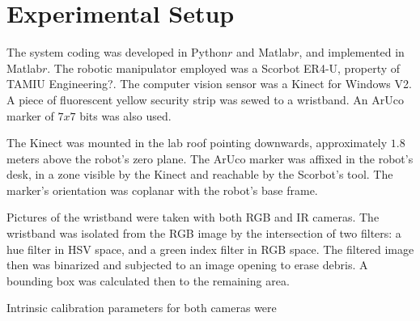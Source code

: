 \documentclass[12pt,a4paper,titlepage]{article}
\begin{document}
\section{Experimental Setup}
The system coding was developed in Python$r$ and Matlab$r$, and implemented in Matlab$r$. The robotic manipulator employed was a Scorbot ER4-U, property of TAMIU Engineering?. The computer vision sensor was a Kinect for Windows V2. A piece of fluorescent yellow security strip was sewed to a wristband. An ArUco marker of $7x7$ bits was also used.

The Kinect was mounted in the lab roof pointing downwards, approximately $1.8$ meters above the robot's zero plane. The ArUco marker was affixed in the robot's desk, in a zone visible by the Kinect and reachable by the Scorbot's tool. The marker's orientation was coplanar with the robot's base frame.

Pictures of the wristband were taken with both RGB and IR cameras. The wristband was isolated from the RGB image by the intersection of two filters: a hue filter in HSV space, and a green index filter in RGB space. The filtered image then was binarized and subjected to an image opening to erase debris. A bounding box was calculated then to the remaining area.

Intrinsic calibration parameters for both cameras were  
\end{document}
